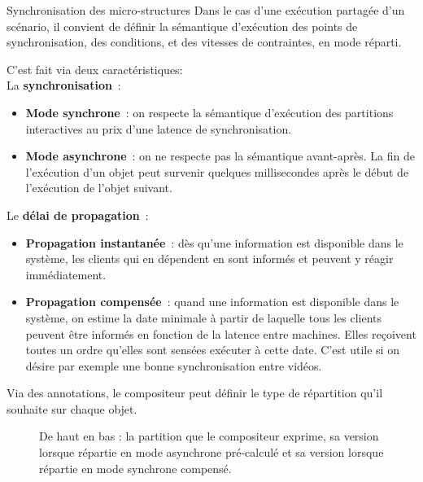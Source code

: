 \begin{block}{Synchronisation des micro-structures}
    Dans le cas d'une exécution partagée d'un scénario, il convient de définir la sémantique d'exécution des points de synchronisation, des conditions, et des vitesses de contraintes, en mode réparti. 
   
    C'est fait via deux caractéristiques:~\\
    La \textbf{synchronisation}~:
	\begin{itemize}
		\item \textbf{Mode synchrone}~: on respecte la sémantique d'exécution des partitions interactives au prix d'une latence de synchronisation.
		\item \textbf{Mode asynchrone}~: on ne respecte pas la sémantique avant-après. La fin de l'exécution d'un objet peut survenir quelques millisecondes après le début de l'exécution de l'objet suivant.
	\end{itemize}

Le \textbf{délai de propagation}~:
\begin{itemize}
    \item \textbf{Propagation instantanée}~: dès qu'une information est disponible dans le système, les clients qui en dépendent en sont informés et peuvent y réagir immédiatement. 
    \item \textbf{Propagation compensée}~: quand une information est disponible dans le système, on estime la date minimale à partir de laquelle tous les clients peuvent être informés en fonction de la latence entre machines. 
    Elles reçoivent toutes un ordre qu'elles sont sensées exécuter à cette date. 
    C'est utile si on désire par exemple une bonne synchronisation entre vidéos.
\end{itemize}

Via des annotations, le compositeur peut définir le type de répartition qu'il souhaite sur chaque objet.

\begin{figure}
	\begin{tikzpicture}[scale=4]
	
	\end{tikzpicture}
	\begin{tikzpicture}[scale=4]
	
	\end{tikzpicture}
	\begin{tikzpicture}[scale=4]
	
	\end{tikzpicture}
	\caption{De haut en bas : la partition que le compositeur exprime, sa version lorsque répartie en mode asynchrone pré-calculé et sa version lorsque répartie en mode synchrone compensé.}
\end{figure}
\end{block}